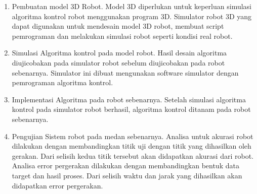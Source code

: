 \begin{enumerate}
	\item Pembuatan model 3D Robot. Model 3D diperlukan untuk keperluan simulasi algoritma kontrol robot menggunakan program 3D. Simulator robot 3D yang dapat digunakan untuk mendesain model 3D robot, membuat script pemrograman dan melakukan simulasi robot seperti kondisi real robot.

\item Simulasi Algoritma kontrol pada model robot. Hasil desain algoritma diujicobakan pada simulator robot sebelum diujicobakan pada robot sebenarnya. Simulator ini dibuat mengunakan software simulator dengan pemrograman algoritma kontrol.

\item Implementasi Algoritma pada robot sebenarnya. Setelah simulasi algoritma kontrol pada simulator robot berhasil, algoritma kontrol ditanam pada robot sebenarnya.
\item Pengujian Sistem robot pada medan sebenarnya. Analisa untuk akurasi robot dilakukan dengan membandingkan titik uji dengan titik yang dihasilkan oleh gerakan. Dari selisih kedua titik tersebut akan didapatkan akurasi dari robot.  Analisa error pergerakan dilakukan dengan membandingkan bentuk data target dan hasil proses. Dari selisih waktu dan jarak yang dihasilkan akan didapatkan error pergerakan.
\end{enumerate}